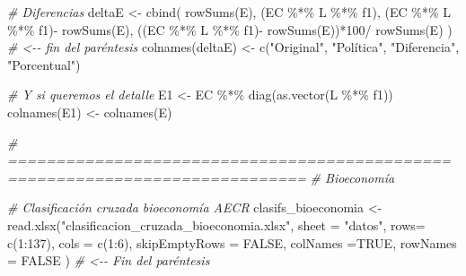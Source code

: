 \documentclass[
]{article}
\newenvironment{Shaded}{\begin{snugshade}}{\end{snugshade}}
\newcommand{\AttributeTok}[1]{\textcolor[rgb]{0.77,0.63,0.00}{#1}}
\newcommand{\CommentTok}[1]{\textcolor[rgb]{0.56,0.35,0.01}{\textit{#1}}}
\newcommand{\ConstantTok}[1]{\textcolor[rgb]{0.00,0.00,0.00}{#1}}
\newcommand{\DecValTok}[1]{\textcolor[rgb]{0.00,0.00,0.81}{#1}}
\newcommand{\FunctionTok}[1]{\textcolor[rgb]{0.00,0.00,0.00}{#1}}
\newcommand{\NormalTok}[1]{#1}
\newcommand{\OtherTok}[1]{\textcolor[rgb]{0.56,0.35,0.01}{#1}}
\newcommand{\SpecialCharTok}[1]{\textcolor[rgb]{0.00,0.00,0.00}{#1}}
\newcommand{\StringTok}[1]{\textcolor[rgb]{0.31,0.60,0.02}{#1}}
\begin{document}
\begin{Shaded}
\begin{Highlighting}[]
\CommentTok{\# Diferencias}
\NormalTok{deltaE }\OtherTok{\textless{}{-}} \FunctionTok{cbind}\NormalTok{( }\FunctionTok{rowSums}\NormalTok{(E), }
\NormalTok{       (EC }\SpecialCharTok{\%*\%}\NormalTok{ L }\SpecialCharTok{\%*\%}\NormalTok{ f1), }
\NormalTok{       (EC }\SpecialCharTok{\%*\%}\NormalTok{ L }\SpecialCharTok{\%*\%}\NormalTok{ f1)}\SpecialCharTok{{-}} \FunctionTok{rowSums}\NormalTok{(E), }
\NormalTok{       ((EC }\SpecialCharTok{\%*\%}\NormalTok{ L }\SpecialCharTok{\%*\%}\NormalTok{ f1)}\SpecialCharTok{{-}} \FunctionTok{rowSums}\NormalTok{(E))}\SpecialCharTok{*}\DecValTok{100}\SpecialCharTok{/} \FunctionTok{rowSums}\NormalTok{(E) }
\NormalTok{       ) }\CommentTok{\# \textless{}{-}{-} fin del paréntesis}
\FunctionTok{colnames}\NormalTok{(deltaE) }\OtherTok{\textless{}{-}} \FunctionTok{c}\NormalTok{(}\StringTok{"Original"}\NormalTok{, }\StringTok{"Política"}\NormalTok{, }\StringTok{"Diferencia"}\NormalTok{, }\StringTok{"Porcentual"}\NormalTok{)}

\CommentTok{\# Y si queremos el detalle}
\NormalTok{E1 }\OtherTok{\textless{}{-}}\NormalTok{ EC }\SpecialCharTok{\%*\%} \FunctionTok{diag}\NormalTok{(}\FunctionTok{as.vector}\NormalTok{(L }\SpecialCharTok{\%*\%}\NormalTok{ f1))}
\FunctionTok{colnames}\NormalTok{(E1) }\OtherTok{\textless{}{-}} \FunctionTok{colnames}\NormalTok{(E)}

\CommentTok{\# =============================================================================}
\CommentTok{\# Bioeconomía}

\CommentTok{\# Clasificación cruzada bioeconomía AECR}
\NormalTok{clasifs\_bioeconomia }\OtherTok{\textless{}{-}} \FunctionTok{read.xlsx}\NormalTok{(}\StringTok{"clasificacion\_cruzada\_bioeconomia.xlsx"}\NormalTok{, }
                                            \AttributeTok{sheet =} \StringTok{"datos"}\NormalTok{, }
                                            \AttributeTok{rows=} \FunctionTok{c}\NormalTok{(}\DecValTok{1}\SpecialCharTok{:}\DecValTok{137}\NormalTok{), }
                                            \AttributeTok{cols =} \FunctionTok{c}\NormalTok{(}\DecValTok{1}\SpecialCharTok{:}\DecValTok{6}\NormalTok{), }
                                            \AttributeTok{skipEmptyRows =} \ConstantTok{FALSE}\NormalTok{, }
                                            \AttributeTok{colNames =}\ConstantTok{TRUE}\NormalTok{, }
                                            \AttributeTok{rowNames =} \ConstantTok{FALSE}
\NormalTok{)  }\CommentTok{\# \textless{}{-}{-} Fin del paréntesis}






\end{Highlighting}
\end{Shaded}
\end{document}
